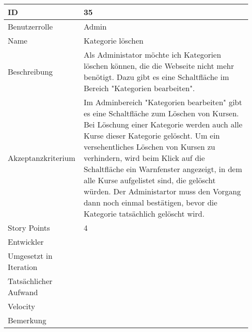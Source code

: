 \begin{tabularx}{\textwidth}{|p{}|X|}
	\hline
	ID & 35\\
	\hline
	Benutzerrolle & Admin\\
	\hline
	Name & Kategorie löschen\\
	\hline
	Beschreibung & Als Administator möchte ich Kategorien löschen können, die die Webseite nicht mehr benötigt. Dazu gibt es eine Schaltfläche im Bereich "Kategorien bearbeiten".\\
	\hline
	Akzeptanzkriterium & Im Adminbereich "Kategorien bearbeiten" gibt es eine Schaltfläche zum Löschen von Kursen. Bei Löschung einer Kategorie werden auch alle Kurse dieser Kategorie gelöscht. Um ein versehentliches Löschen von Kursen zu verhindern, wird beim Klick auf die Schaltfläche ein Warnfenster angezeigt, in dem alle Kurse aufgelistet sind, die gelöscht würden. Der Administartor muss den Vorgang dann noch einmal bestätigen, bevor die Kategorie tatsächlich gelöscht wird.\\
	\hline
	Story Points & 4 \\
	\hline
	Entwickler & \\
	\hline
	Umgesetzt in Iteration & \\
	\hline
	Tatsächlicher Aufwand & \\
	\hline
	Velocity & \\
	\hline
	Bemerkung & \\
	\hline
\end{tabularx}
\vspace{20pt}
